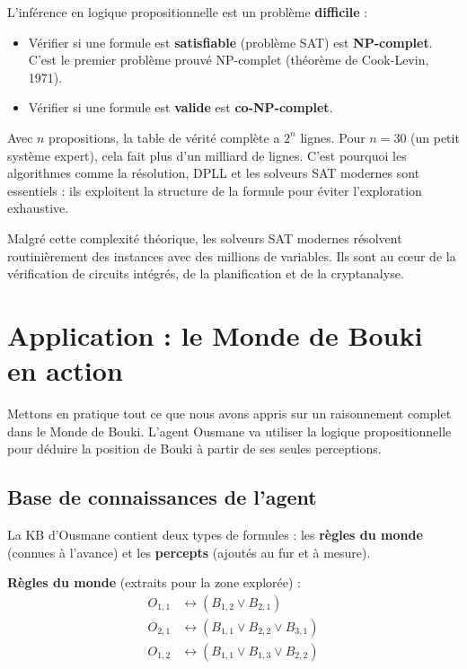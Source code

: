 \documentclass[11pt,a4paper]{article}
\begin{document}
\begin{attentionbox}
L'inférence en logique propositionnelle est un problème \textbf{difficile} :
\begin{itemize}[nosep]
    \item Vérifier si une formule est \textbf{satisfiable} (problème SAT) est \textbf{NP-complet}. C'est le premier problème prouvé NP-complet (théorème de Cook-Levin, 1971).
    \item Vérifier si une formule est \textbf{valide} est \textbf{co-NP-complet}.
\end{itemize}

Avec $n$ propositions, la table de vérité complète a $2^n$ lignes. Pour $n = 30$ (un petit système expert), cela fait plus d'un milliard de lignes. C'est pourquoi les algorithmes comme la résolution, DPLL et les solveurs SAT modernes sont essentiels : ils exploitent la structure de la formule pour éviter l'exploration exhaustive.

Malgré cette complexité théorique, les solveurs SAT modernes résolvent routinièrement des instances avec des millions de variables. Ils sont au cœur de la vérification de circuits intégrés, de la planification et de la cryptanalyse.
\end{attentionbox}

\section{Application : le Monde de Bouki en action}

Mettons en pratique tout ce que nous avons appris sur un raisonnement complet dans le Monde de Bouki. L'agent Ousmane va utiliser la logique propositionnelle pour déduire la position de Bouki à partir de ses seules perceptions.

\subsection{Base de connaissances de l'agent}

La KB d'Ousmane contient deux types de formules : les \textbf{règles du monde} (connues à l'avance) et les \textbf{percepts} (ajoutés au fur et à mesure).

\textbf{Règles du monde} (extraits pour la zone explorée) :
\begin{align}
O_{1,1} &\leftrightarrow (B_{1,2} \lor B_{2,1}) \label{eq:r1} \\
O_{2,1} &\leftrightarrow (B_{1,1} \lor B_{2,2} \lor B_{3,1}) \label{eq:r2} \\
O_{1,2} &\leftrightarrow (B_{1,1} \lor B_{1,3} \lor B_{2,2}) \label{eq:r3}
\end{align}
\end{document}
